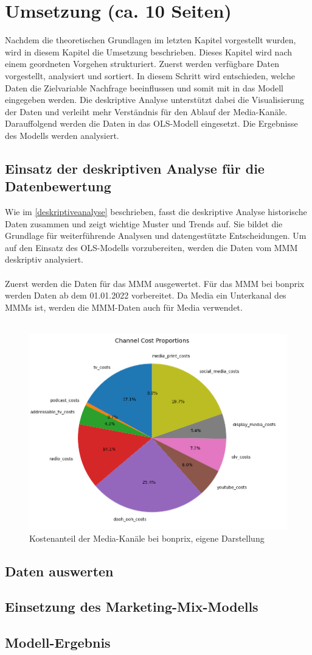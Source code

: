 \newpage
\section{Umsetzung (ca. 10 Seiten)}
Nachdem die theoretischen Grundlagen im letzten Kapitel vorgestellt wurden, wird in diesem Kapitel die Umsetzung beschrieben. Dieses Kapitel wird nach einem geordneten Vorgehen strukturiert. Zuerst werden verfügbare Daten vorgestellt, analysiert und sortiert. In diesem Schritt wird entschieden, welche Daten die Zielvariable Nachfrage beeinflussen und somit mit in das Modell eingegeben werden. Die deskriptive Analyse unterstützt dabei die Visualisierung der Daten und verleiht mehr Verständnis für den Ablauf der Media-Kanäle. Darauffolgend werden die Daten in das OLS-Modell eingesetzt. Die Ergebnisse des Modells werden analysiert.
\subsection{Einsatz der deskriptiven Analyse für die Datenbewertung}
Wie im \autoref{deskriptiveanalyse} beschrieben, fasst die deskriptive Analyse historische Daten zusammen und zeigt wichtige Muster und Trends auf. Sie bildet die Grundlage für weiterführende Analysen und datengestützte Entscheidungen. Um auf den Einsatz des OLS-Modells vorzubereiten, werden die Daten vom \ac{MMM} deskriptiv analysiert. \\\\
Zuerst werden die Daten für das \ac{MMM} ausgewertet. Für das \ac{MMM} bei bonprix werden Daten ab dem 01.01.2022 vorbereitet. Da Media ein Unterkanal des \ac{MMM}s ist, werden die \ac{MMM}-Daten auch für Media verwendet. \\\\

\begin{figure}[ht]
    \centering
    \includegraphics[width=0.8\linewidth]{images/mediapie.png}
    \caption{Kostenanteil der Media-Kanäle bei bonprix, eigene Darstellung}
    \label{fig:mediapie}
\end{figure}

\subsection{Daten auswerten}
\subsection{Einsetzung des Marketing-Mix-Modells}
\subsection{Modell-Ergebnis}
